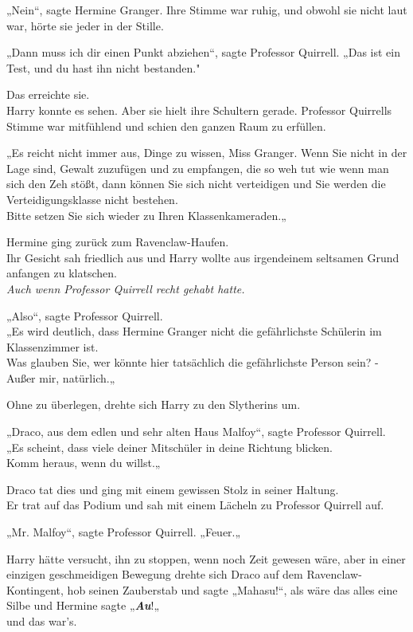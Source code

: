 {„Nein“, sagte Hermine Granger. Ihre Stimme war ruhig, und obwohl sie nicht laut war, hörte sie jeder in der Stille.

„Dann muss ich dir einen Punkt abziehen“, sagte Professor Quirrell. „Das ist ein Test, und du hast ihn nicht bestanden."

Das erreichte sie.\\ Harry konnte es sehen. Aber sie hielt ihre Schultern gerade. Professor Quirrells Stimme war mitfühlend und schien den ganzen Raum zu erfüllen.

„Es reicht nicht immer aus, Dinge zu wissen, Miss Granger. Wenn Sie nicht in der Lage sind, Gewalt zuzufügen und zu empfangen, die so weh tut wie wenn man sich den Zeh stößt, dann können Sie sich nicht verteidigen und Sie werden die Verteidigungsklasse nicht bestehen.\\ Bitte setzen Sie sich wieder zu Ihren Klassenkameraden.„

Hermine ging zurück zum Ravenclaw-Haufen.\\ Ihr Gesicht sah friedlich aus und Harry wollte aus irgendeinem seltsamen Grund anfangen zu klatschen.\\ \emph{Auch wenn Professor Quirrell recht gehabt hatte.}

„Also“, sagte Professor Quirrell.\\ „Es wird deutlich, dass Hermine Granger nicht die gefährlichste Schülerin im Klassenzimmer ist.\\ Was glauben Sie, wer könnte hier tatsächlich die gefährlichste Person sein? - Außer mir, natürlich.„

Ohne zu überlegen, drehte sich Harry zu den Slytherins um.

„Draco, aus dem edlen und sehr alten Haus Malfoy“, sagte Professor Quirrell.\\ „Es scheint, dass viele deiner Mitschüler in deine Richtung blicken.\\ Komm heraus, wenn du willst.„

Draco tat dies und ging mit einem gewissen Stolz in seiner Haltung.\\ Er trat auf das Podium und sah mit einem Lächeln zu Professor Quirrell auf.

„Mr. Malfoy“, sagte Professor Quirrell. „Feuer.„

Harry hätte versucht, ihn zu stoppen, wenn noch Zeit gewesen wäre, aber in einer einzigen geschmeidigen Bewegung drehte sich Draco auf dem Ravenclaw-Kontingent, hob seinen Zauberstab und sagte „Mahasu!“, als wäre das alles eine Silbe und Hermine sagte „\textbf{\emph{Au}}!„\\ und das war's.

}
